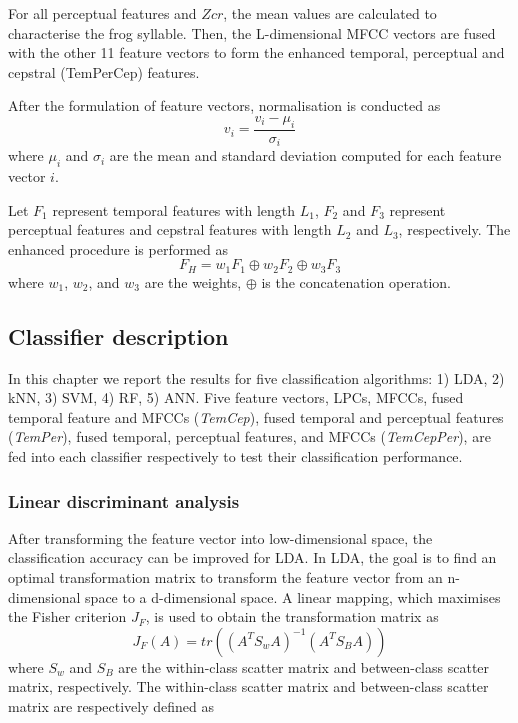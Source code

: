 For all perceptual features and $Zcr$, the mean values are calculated to characterise the frog syllable. Then, the L-dimensional MFCC vectors are fused with the other 11 feature vectors to form the enhanced temporal, perceptual and cepstral (TemPerCep) features.

After the formulation of feature vectors, normalisation is conducted as 
\begin{equation}
v_{i} = \frac{v_{i}-\mu_{i}}{\sigma_{i}}
\end{equation} 
where $\mu_{i}$ and $\sigma_{i}$ are the mean and standard deviation computed for each feature vector $i$.  

Let $F_{1}$ represent temporal features with length $L_{1}$, $F_{2}$ and $F_{3}$ represent perceptual features and cepstral features with length $L_{2}$ and $L_{3}$, respectively. The enhanced procedure is performed as
\begin{equation}
F_{H} = w_{1}F_{1}\oplus w_{2}F_{2} \oplus w_{3}F_{3}
\end{equation} 
where $w_{1}$, $w_{2}$, and $w_{3}$ are the weights, $\oplus$ is the concatenation operation.


\subsection{Classifier description}

\label{ch4:classifierDesign}
In this chapter we report the results for five classification algorithms: 1) LDA, 2) kNN, 3) SVM, 4) RF, 5) ANN. Five feature vectors, LPCs, MFCCs, fused temporal feature and MFCCs (\textit{TemCep}), fused temporal and perceptual features (\textit{TemPer}), fused temporal, perceptual features, and MFCCs (\textit{TemCepPer}), are fed into each classifier respectively to test their classification performance.

\subsubsection{Linear discriminant analysis}
After transforming the feature vector into low-dimensional space, the classification accuracy can be improved for LDA. In LDA, the goal is to find an optimal transformation matrix to transform the feature vector from an n-dimensional space to a d-dimensional space. A linear mapping, which maximises the Fisher criterion $J_{F}$, is used to obtain the transformation matrix as
\begin{equation}
J_{F}(A)=tr((A^{T}S_{w}A)^{-1}(A^{T}S_{B}A))
\end{equation}
where $S_{w}$ and $S_{B}$ are the within-class scatter matrix and between-class scatter matrix, respectively. The within-class scatter matrix and between-class scatter matrix are respectively defined as 

